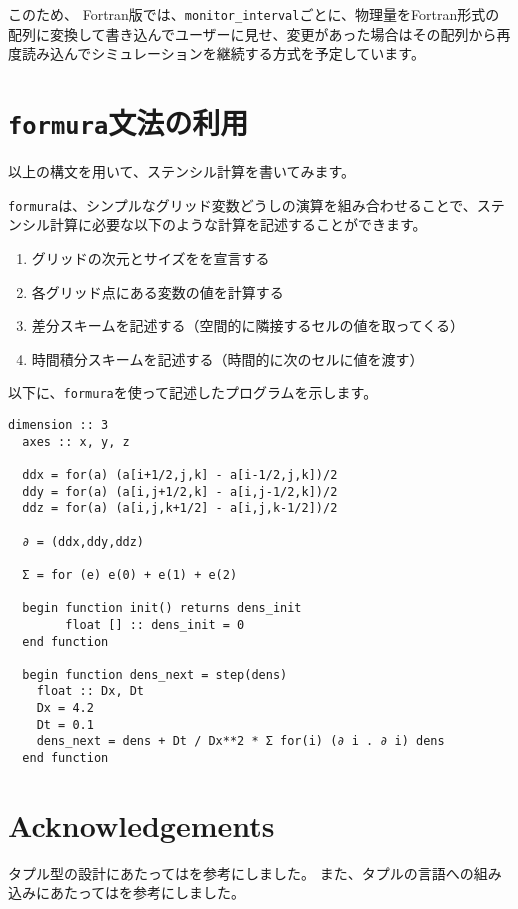 \documentclass{jsarticle}
\newcommand{\formura}{{\texttt{formura}}}
\begin{document}
このため、
Fortran版では、\verb`monitor_interval`ごとに、物理量をFortran形式の配列に変換して書き込んでユーザーに見せ、変更があった場合はその配列から再度読み込んでシミュレーションを継続する方式を予定しています。

\newpage
\section{\formura 文法の利用}

以上の構文を用いて、ステンシル計算を書いてみます。


\formura は、シンプルなグリッド変数どうしの演算を組み合わせることで、ステンシル計算に必要な以下のような計算を記述することができます。

\begin{enumerate}
\item グリッドの次元とサイズをを宣言する
\item 各グリッド点にある変数の値を計算する
\item 差分スキームを記述する（空間的に隣接するセルの値を取ってくる）
\item 時間積分スキームを記述する（時間的に次のセルに値を渡す）
\end{enumerate}


以下に、\formura を使って記述したプログラムを示します。

\begin{lstlisting}[mathescape]
  dimension :: 3
  axes :: x, y, z

  ddx = for(a) (a[i+1/2,j,k] - a[i-1/2,j,k])/2
  ddy = for(a) (a[i,j+1/2,k] - a[i,j-1/2,k])/2
  ddz = for(a) (a[i,j,k+1/2] - a[i,j,k-1/2])/2

  ∂ = (ddx,ddy,ddz)

  Σ = for (e) e(0) + e(1) + e(2)

  begin function init() returns dens_init
        float [] :: dens_init = 0
  end function

  begin function dens_next = step(dens)
    float :: Dx, Dt
    Dx = 4.2
    Dt = 0.1
    dens_next = dens + Dt / Dx**2 * Σ for(i) (∂ i . ∂ i) dens
  end function
\end{lstlisting}

\newpage

\section*{Acknowledgements}

タプル型の設計にあたっては\citet{pierce2002types}を参考にしました。
また、タプルの言語への組み込みにあたっては\citet{oliveira2015modular}を参考にしました。





\end{document}
